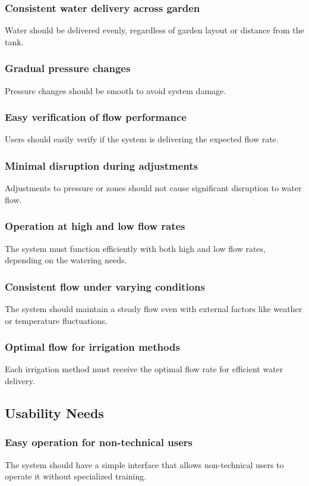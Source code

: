 \documentclass[12pt]{report}
\begin{document}
\subsubsection{Consistent water delivery across garden}
Water should be delivered evenly, regardless of garden layout or distance from the tank.

\subsubsection{Gradual pressure changes}
Pressure changes should be smooth to avoid system damage.
\subsubsection{Easy verification of flow performance}
Users should easily verify if the system is delivering the expected flow rate.

\subsubsection{Minimal disruption during adjustments}
Adjustments to pressure or zones should not cause significant disruption to water flow.

\subsubsection{Operation at high and low flow rates}
The system must function efficiently with both high and low flow rates, depending on the watering needs.

\subsubsection{Consistent flow under varying conditions}
The system should maintain a steady flow even with external factors like weather or temperature fluctuations.

\subsubsection{Optimal flow for irrigation methods}
Each irrigation method must receive the optimal flow rate for efficient water delivery.

\newpage
\subsection{Usability Needs}

\subsubsection{Easy operation for non-technical users}
The system should have a simple interface that allows non-technical users to operate it without specialized training.
\end{document}
